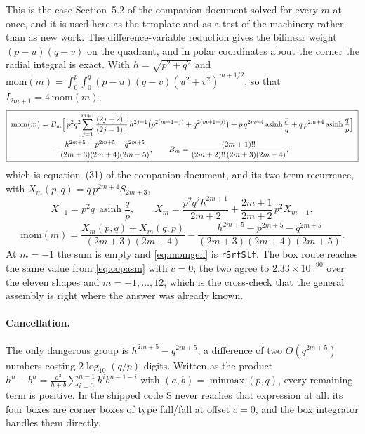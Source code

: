 \documentclass[11pt]{article}
\theoremstyle{remark}
\newcommand{\asinh}{\operatorname{asinh}}
\newcommand{\code}[1]{\texttt{#1}}
\begin{document}
This is the case Section~5.2 of the companion document solved for every $m$ at once, and
it is used here as the template and as a test of the machinery rather than as new work.
The difference-variable reduction gives the bilinear weight $(p-u)(q-v)$ on the quadrant,
and in polar coordinates about the corner the radial integral is exact. With
$h = \sqrt{p^2+q^2}$ and
$\mathrm{mom}(m) = \int_0^p\!\int_0^q (p-u)(q-v)(u^2+v^2)^{m+1/2}$, so that
$I_{2m+1} = 4\,\mathrm{mom}(m)$,
{\small
\begin{equation}
\boxed{\;
\begin{aligned}
\mathrm{mom}(m) = {}& B_m\Bigl[\, p^2 q^2 \!\sum_{j=1}^{m+1} \frac{(2j-2)!!}{(2j-1)!!}\, h^{2j-1}\bigl(p^{2(m+1-j)} + q^{2(m+1-j)}\bigr)
+ p\,q^{2m+4}\asinh\frac{p}{q} + q\,p^{2m+4}\asinh\frac{q}{p} \Bigr] \\
& - \frac{h^{2m+5} - p^{2m+5} - q^{2m+5}}{(2m+3)(2m+4)(2m+5)},
\qquad
B_m = \frac{(2m+1)!!}{(2m+2)!!\,(2m+3)(2m+4)},
\end{aligned}\;}
\label{eq:momgen}
\end{equation}}%
which is equation~(31) of the companion document, and its two-term recurrence, with
$X_m(p,q) = q\,p^{2m+4}S_{2m+3}$,
\begin{equation}
X_{-1} = p^2 q\,\asinh\frac{q}{p},\qquad
X_m = \frac{p^2 q^2 h^{2m+1}}{2m+2} + \frac{2m+1}{2m+2}\,p^2 X_{m-1},
\end{equation}
\begin{equation}
\mathrm{mom}(m) = \frac{X_m(p,q) + X_m(q,p)}{(2m+3)(2m+4)} - \frac{h^{2m+5} - p^{2m+5} - q^{2m+5}}{(2m+3)(2m+4)(2m+5)} .
\end{equation}
At $m = -1$ the sum is empty and \eqref{eq:momgen} is \code{rSrfSlf}. The box route reaches
the same value from \eqref{eq:copasm} with $c = 0$; the two agree to $2.33\times10^{-90}$
over the eleven shapes and $m = -1,\ldots,12$, which is the cross-check that the general
assembly is right where the answer was already known.

\paragraph{Cancellation.} The only dangerous group is $h^{2m+5} - q^{2m+5}$, a difference
of two $O(q^{2m+5})$ numbers costing $2\log_{10}(q/p)$ digits. Written as the product
$h^n - b^n = \frac{a^2}{h+b}\sum_{i=0}^{n-1}h^i b^{n-1-i}$ with
$(a,b) = \operatorname{minmax}(p,q)$, every remaining term is positive. In the shipped
code S never reaches that expression at all: its four boxes are corner boxes of type
fall/fall at offset $c = 0$, and the box integrator handles them directly.
\end{document}
